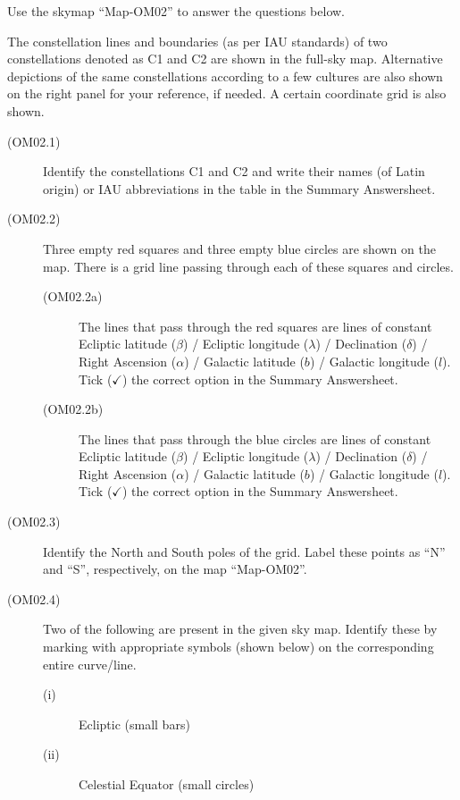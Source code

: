 Use the skymap ``Map-OM02'' to answer the questions below.

The constellation lines and boundaries (as per IAU standards) of two
constellations denoted as C1 and C2 are shown in the full-sky map. Alternative
depictions of the same constellations according to a few cultures are also
shown on the right panel for your reference, if needed. A certain coordinate
grid is also shown.


\begin{description}
\item[(OM02.1)] Identify the constellations C1 and C2 and write their names
  (of Latin origin) or IAU abbreviations in the table in the Summary
  Answersheet.
\item[(OM02.2)] Three empty red squares and three empty blue circles are shown
  on the map. There is a grid line passing through each of these squares and
  circles.
  \begin{description}
  \item[(OM02.2a)] The lines that pass through the red squares are lines of
    constant Ecliptic latitude ($\beta$) / Ecliptic longitude ($\lambda$) /
    Declination ($\delta$) / Right Ascension ($\alpha$) / Galactic latitude
    ($b$) / Galactic longitude ($l$). Tick ($\checkmark$) the correct option
    in the Summary Answersheet.
  \item[(OM02.2b)] The lines that pass through the blue circles are lines of
    constant Ecliptic latitude ($\beta$) / Ecliptic longitude ($\lambda$) /
    Declination ($\delta$) / Right Ascension ($\alpha$) / Galactic latitude
    ($b$) / Galactic longitude ($l$). Tick ($\checkmark$) the correct option
    in the Summary Answersheet.
  \end{description}
\item[(OM02.3)] Identify the North and South poles of the grid. Label these
  points as ``N'' and ``S'', respectively, on the map ``Map-OM02''.
\item[(OM02.4)] Two of the following are present in the given sky map.
  Identify these by marking with appropriate symbols (shown below) on the
  corresponding entire curve/line.
  \begin{description}
  \item[(i)] Ecliptic (small bars)
  \item[(ii)] Celestial Equator (small circles)

\end{description}
\end{description}
